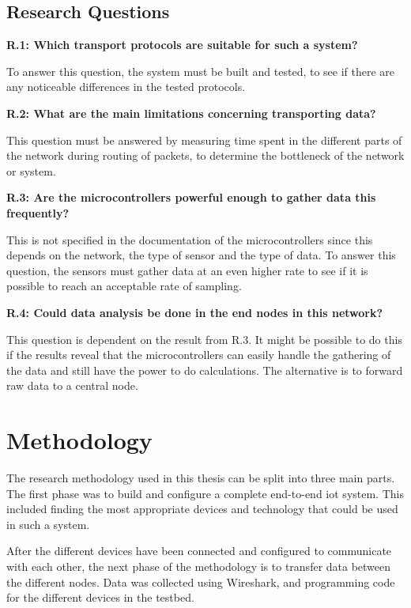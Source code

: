 \subsection{Research Questions}

\noindent \textbf{R.1: Which transport protocols are suitable for such a system?}

\noindent To answer this question, the system must be built and tested, to see if there are any noticeable differences in the tested protocols.

\noindent\textbf{R.2: What are the main limitations concerning transporting data?}

\noindent This question must be answered by measuring time spent in the different parts of the network during routing of packets, to determine the bottleneck of the network or system. 

\noindent\textbf{R.3: Are the \glspl{microcontroller} powerful enough to gather data this frequently?}

\noindent This is not specified in the documentation of the \glspl{microcontroller} since this depends on the network, the type of sensor and the type of data. To answer this question, the sensors must gather data at an even higher rate to see if it is possible to reach an acceptable rate of sampling. 

\noindent\textbf{R.4: Could data analysis be done in the end nodes in this network?}

\noindent This question is dependent on the result from R.3. It might be possible to do this if the results reveal that the \glspl{microcontroller} can easily handle the gathering of the data and still have the power to do calculations. The alternative is to forward raw data to a central node. 

\section{Methodology}

\noindent The research methodology used in this thesis can be split into three main parts. The first phase was to build and configure a complete end-to-end \gls{iot} system. This included finding the most appropriate devices and technology that could be used in such a system. 

\noindent After the different devices have been connected and configured to communicate with each other, the next phase of the methodology is to transfer data between the different nodes. Data was collected using Wireshark, and programming code for the different devices in the testbed. 

